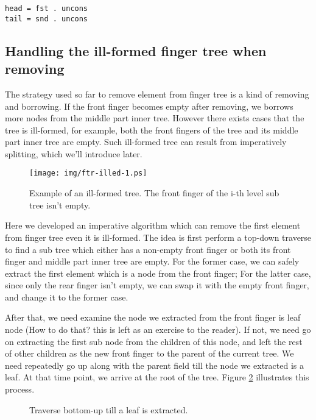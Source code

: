 \documentclass[UTF8]{article}
\begin{document}
\begin{lstlisting}
head = fst . uncons
tail = snd . uncons
\end{lstlisting}

\subsection{Handling the ill-formed finger tree when removing}
The strategy used so far to remove element from finger tree is a kind of removing and borrowing.
If the front finger becomes empty after removing, we borrows more nodes from the middle part
inner tree. However there exists cases that the tree is ill-formed, for example, both the
front fingers of the tree and its middle part inner tree are empty. Such ill-formed tree
can result from imperatively splitting, which we'll introduce later.

\begin{figure}[htbp]
  \centering
  \texttt{[image: img/ftr-illed-1.ps]}
  \caption{Example of an ill-formed tree. The front finger of the i-th level sub tree isn't empty.} \label{fig:ftr-illed-form}
\end{figure}

Here we developed an imperative algorithm which can remove the first element from finger tree
even it is ill-formed. The idea is first perform a top-down traverse to find a sub tree which
either has a non-empty front finger or both its front finger and middle part inner tree are empty.
For the former case, we can safely extract the first element which is a node from the front finger;
For the latter case, since only the rear finger isn't empty, we can swap it with the empty front
finger, and change it to the former case.

After that, we need examine the node we extracted from the front finger is leaf node (How to do
that? this is left as an exercise to the reader). If not, we need go on extracting the first
sub node from the children of this node, and left the rest of other children as the new
front finger to the parent of the current tree. We need repeatedly go up along with the
parent field till the node we extracted is a leaf. At that time point, we arrive at the
root of the tree. Figure \ref{fig:ftr-illed-extract} illustrates this process.

\begin{figure}[htbp]
  \centering
  \caption{Traverse bottom-up till a leaf is extracted.} \label{fig:ftr-illed-extract}
\end{figure}
\end{document}
